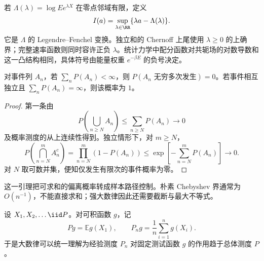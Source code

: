 \begin{definition}
若 $\Lambda(\lambda)=\log Ee^{\lambda X}$ 在零点邻域有限，定义
\[
 I(a)=\sup_{\lambda\in\RR}\{\lambda a-\Lambda(\lambda)\}.
\]
它是 $\Lambda$ 的 Legendre--Fenchel 变换。独立和的 Chernoff 上尾使用 $\lambda\ge0$ 的上确界；完整速率函数则同时容许正负 $\lambda$。统计力学中配分函数对共轭场的对数导数和这一凸结构相同，具体符号由能量权重 $e^{-\beta E}$ 的负号决定。
\end{definition}

\begin{lemma}
对事件列 $A_n$，若 $\sum_nP(A_n)<\infty$，则 $P(A_n\text{ 无穷多次发生})=0$。若事件相互独立且 $\sum_nP(A_n)=\infty$，则该概率为 $1$。
\end{lemma}
\begin{proof}
第一条由
\[
 P\!\left(\bigcup_{n\ge N}A_n\right)\le\sum_{n\ge N}P(A_n)\longrightarrow0
\]
及概率测度的从上连续性得到。独立情形下，对 $m\ge N$，
\[
 P\!\left(\bigcap_{n=N}^m A_n^c\right)
 =\prod_{n=N}^m(1-P(A_n))
 \le\exp\!\left[-\sum_{n=N}^mP(A_n)\right]\longrightarrow0.
\]
对 $N$ 取可数并集，便知仅发生有限次的事件概率为零。
\end{proof}
这一引理把可求和的偏离概率转成样本路径控制。朴素 Chebyshev 界通常为 $O(n^{-1})$，不能直接求和；强大数律因此还需要截断与最大不等式。

设 $X_1,X_2,\ldots\iid P$。对可积函数 $g$，记
\[
 Pg=\mathbb E g(X_1),
 \qquad
 P_ng=\frac1n\sum_{i=1}^ng(X_i).
\]
于是大数律可以统一理解为经验测度 $P_n$ 对固定测试函数 $g$ 的作用趋于总体测度 $P$。

